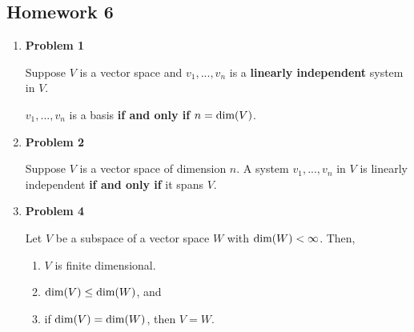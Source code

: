 \subsection{Homework 6}
\begin{enumerate}
    \item[] \textbf{Problem 1}
    \begin{lemma}
        Suppose $V$ is a vector space and $v_1, ..., v_n$ is a \textbf{linearly independent} system in $V$.
        
        $v_1, ..., v_n$ is a basis \textbf{if and only if} $n = \text{dim}(V)$.
    \end{lemma}
    \item[] \textbf{Problem 2}
    \begin{lemma}
        Suppose $V$ is a vector space of dimension $n$. A system $v_1, ..., v_n$ in $V$ is linearly independent \textbf{if and only if} it spans $V$.
    \end{lemma}
    \item[] \textbf{Problem 4}
    \begin{thm}
        Let $V$ be a subspace of a vector space $W$ with $\text{dim}(W) < \infty$. Then,
        \begin{enumerate}
            \item $V$ is finite dimensional.
            \item $\text{dim}(V) \leq \text{dim}(W)$, and
            \item if $\text{dim}(V) = \text{dim}(W)$, then $V = W$.
        \end{enumerate}
    \end{thm}
\end{enumerate}

